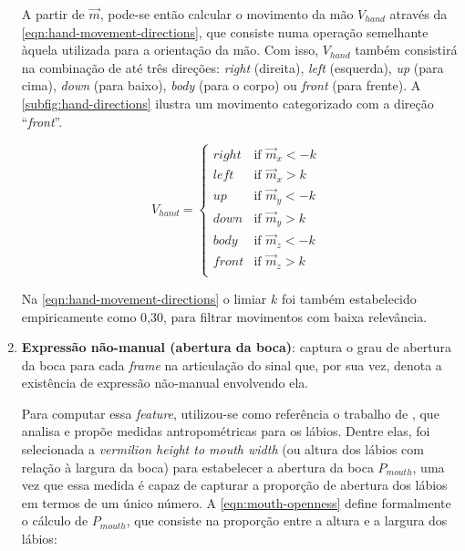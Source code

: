 \begin{enumerate}
          A partir de \(\overrightarrow{m}\), pode-se então calcular o movimento da mão \(V_{hand}\) através da \autoref{eqn:hand-movement-directions}, que consiste numa operação semelhante àquela utilizada para a orientação da mão.
          Com isso, \(V_{hand}\) também consistirá na combinação de até três direções: \textit{right} (direita), \textit{left} (esquerda), \textit{up} (para cima), \textit{down} (para baixo), \textit{body} (para o corpo) ou \textit{front} (para frente).
          A \autoref{subfig:hand-directions} ilustra um movimento categorizado com a direção ``\textit{front}''.

          \begin{equation}
              \label{eqn:hand-movement-directions}
              V_{hand} =
              \begin{cases}
                  right & \text{if $\overrightarrow{m}_x < {-k}$ } \\
                  left  & \text{if $\overrightarrow{m}_x > {k}$ }  \\
                  up    & \text{if $\overrightarrow{m}_y < {-k}$ } \\
                  down  & \text{if $\overrightarrow{m}_y > {k}$ }  \\
                  body  & \text{if $\overrightarrow{m}_z < {-k}$ } \\
                  front & \text{if $\overrightarrow{m}_z > {k}$ }  \\
              \end{cases}
          \end{equation}

          Na \autoref{eqn:hand-movement-directions} o limiar \(k\) foi também estabelecido empiricamente como 0,30, para filtrar movimentos com baixa relevância.


    \item \textbf{Expressão não-manual (abertura da boca)}: captura o grau de abertura da boca para cada \textit{frame} na articulação do sinal que, por sua vez, denota a existência de expressão não-manual envolvendo ela.

          Para computar essa \textit{feature}, utilizou-se como referência o trabalho de , que analisa e propõe medidas antropométricas para os lábios.
          Dentre elas, foi selecionada a \textit{vermilion height to mouth width} (ou altura dos lábios com relação à largura da boca) para estabelecer a abertura da boca \(P_{mouth}\), uma vez que essa medida é capaz de capturar a proporção de abertura dos lábios em termos de um único número.
          A \autoref{eqn:mouth-openness} define formalmente o cálculo de \(P_{mouth}\), que consiste na proporção entre a altura e a largura dos lábios:


\end{enumerate}

